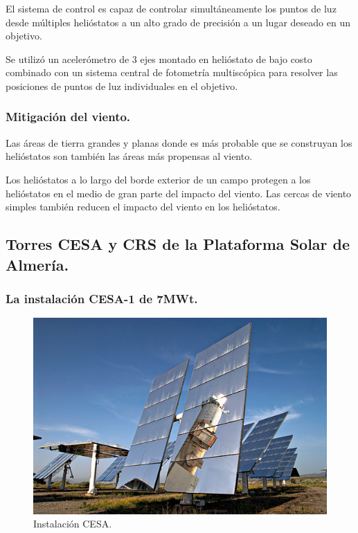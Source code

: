 El sistema de control es capaz de controlar simultáneamente los puntos de luz desde múltiples helióstatos a un alto grado de precisión a un lugar deseado en un objetivo.

Se utilizó un acelerómetro de 3 ejes montado en helióstato de bajo costo combinado con un sistema central de fotometría multiscópica para resolver las posiciones de puntos de luz individuales en el objetivo.

\subsubsection{Mitigación del viento.}

Las áreas de tierra grandes y planas donde es más probable que se construyan los helióstatos son también las áreas más propensas al viento.

Los helióstatos a lo largo del borde exterior de un campo protegen a los helióstatos en el medio de gran parte del impacto del viento. Las cercas de viento simples también reducen el impacto del viento en los helióstatos. \cite{GoogleWebSite}



\subsection{Torres CESA y CRS de la Plataforma Solar de Almería.}

\subsubsection{La instalación CESA-1 de 7MWt.}

\begin{figure}[h!]
  	\centering
	\includegraphics[width=\textwidth]{FotosPaginasWebHeliostatos/unnamed(4).png}
	\caption{Instalación CESA.~\cite{PSA1WebSite}
	\label{fig:FotosPaginasWebHeliostatos/unnamed(4).png}}
\end{figure}

